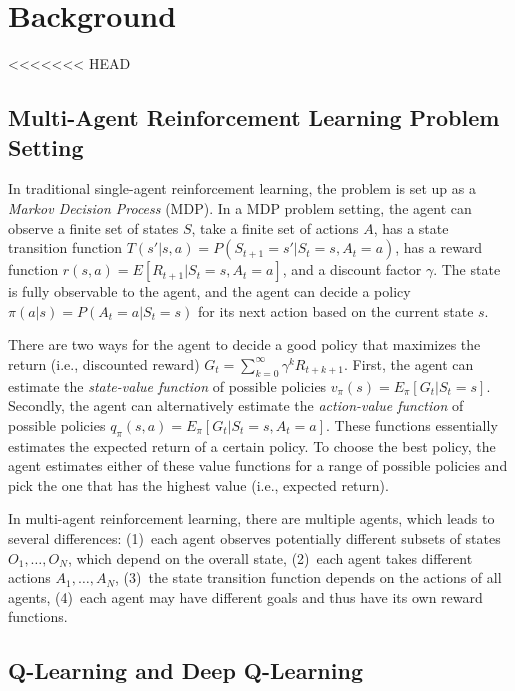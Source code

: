 
\section{Background}
<<<<<<< HEAD
\label{sec:background}

\subsection{Multi-Agent Reinforcement Learning Problem Setting}

In traditional single-agent reinforcement learning, the problem is set up as a
\emph{Markov Decision Process} (MDP). In a MDP problem setting, the agent can observe
a finite set of states $S$, take a finite set of actions $A$, has a state
transition function $T(s'|s,a) = P(S_{t+1}=s'|S_t=s, A_t=a)$, has a reward
function $r(s,a) = E[R_{t+1}|S_t=s, A_t=a]$, and a discount factor $\gamma$.
The state is fully observable to the agent, and the agent can decide a policy
$\pi(a|s) = P(A_t=a | S_t=s)$ for its next action based on the current state
$s$.

There are two ways for the agent to decide a good policy that maximizes the
return (i.e., discounted reward) $G_t = \sum_{k=0}^\infty \gamma^k R_{t+k+1}$.
First, the agent can estimate the \emph{state-value function} of possible policies
$v_\pi(s) = E_\pi[G_t|S_t=s]$. Secondly, the agent can alternatively
estimate the \emph{action-value function} of possible policies
$q_\pi(s,a) = E_\pi[G_t|S_t=s, A_t=a]$. These functions essentially estimates
the expected return of a certain policy. To choose the best policy, the agent
estimates either of these value functions for a range of possible policies and
pick the one that has the highest value (i.e., expected return).

In multi-agent reinforcement learning, there are multiple agents, which leads
to several differences: (1)~each agent observes potentially different subsets
of states $O_1,\ldots,O_N$, which depend on the overall state, (2)~each agent
takes different actions $A_1,\ldots,A_N$, (3)~the state transition function
depends on the actions of all agents, (4)~each agent may have different goals
and thus have its own reward functions.

\subsection{Q-Learning and Deep Q-Learning}



